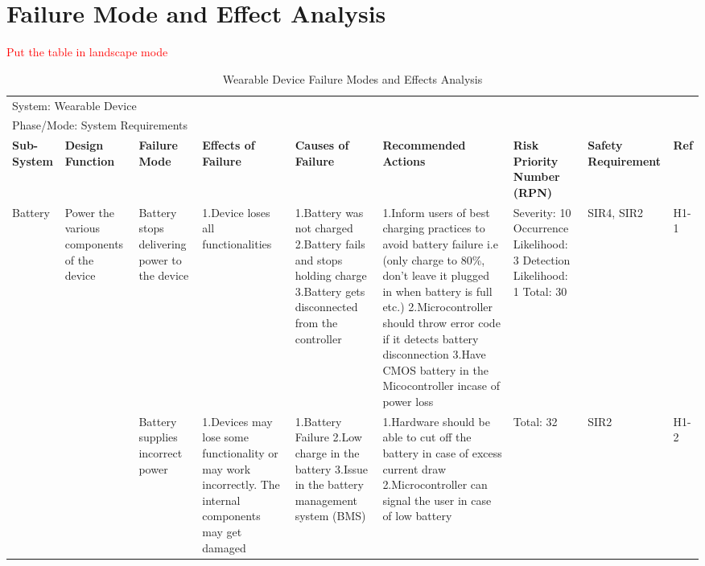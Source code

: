 \documentclass{article}
\begin{document}
\section{Failure Mode and Effect Analysis}
\textcolor{red}{Put the table in landscape mode}
\begin{landscape}
\begin{table}[H]
\centering
    \caption{Wearable Device Failure Modes and Effects Analysis}
	
    \begin{tabular}{| p{} | p{}  | p{} | p{} | p{} | p{} | p{} | p{} | p{} |}
    \hline
    
    \multicolumn{9}{|l|}{System: Wearable Device} \\
    \multicolumn{9}{|l|}{Phase/Mode: System Requirements} \\ \hline
    \textbf{Sub-System} & \textbf{Design Function} & \textbf{Failure Mode} & \textbf{Effects of Failure} & \textbf{Causes of Failure} & \textbf{Recommended Actions} & \textbf{Risk Priority Number (RPN)} & \textbf{Safety Requirement} & \textbf{Ref} \\ \hline

    Battery & Power the various components of the device  & Battery stops delivering power to the device & 1.Device loses all functionalities & 1.Battery was not charged \newline 2.Battery fails and stops holding charge \newline 3.Battery gets disconnected from the controller & 1.Inform users of best charging practices to avoid battery failure i.e (only charge to 80\%, don't leave it plugged in when battery is full etc.) \newline 2.Microcontroller should throw error code if it detects battery disconnection \newline 3.Have CMOS battery in the Micocontroller incase of power loss & Severity: 10 \newline Occurrence Likelihood: 3 \newline Detection Likelihood: 1 \newline Total: 30 & SIR4, SIR2 & H1-1 \\ \cline{3-9}
    
     & & Battery supplies incorrect power & 1.Devices may lose some functionality or may work incorrectly. The internal components may get damaged & 1.Battery Failure \newline 2.Low charge in the battery \newline 3.Issue in the battery management system (BMS) & 1.Hardware should be able to cut off the battery in case of excess current draw \newline 2.Microcontroller can signal the user in case of low battery & Total: 32 & SIR2 & H1-2 \\ \cline{1-9}


\end{tabular}
\end{table}
\end{landscape}
\end{document}
